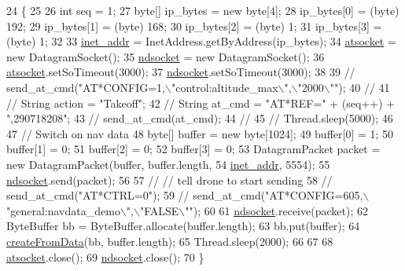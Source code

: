 \begin{DoxyCode}
24                                                             \{
25 
26         \textcolor{keywordtype}{int} seq = 1;
27         byte[] ip\_bytes = \textcolor{keyword}{new} byte[4];
28         ip\_bytes[0] = (byte) 192;
29         ip\_bytes[1] = (byte) 168;
30         ip\_bytes[2] = (byte) 1;
31         ip\_bytes[3] = (byte) 1;
32 
33         \hyperlink{classworkspace_1_1_a_r_drone_nav_data_1_1src_1_1_nav_data_a822661933201f8b0c1c6da6919b62b81}{inet\_addr} = InetAddress.getByAddress(ip\_bytes);
34         \hyperlink{classworkspace_1_1_a_r_drone_nav_data_1_1src_1_1_nav_data_a06573f3f3fcbeb54e9d5d087410117ac}{atsocket} = \textcolor{keyword}{new} DatagramSocket();
35         \hyperlink{classworkspace_1_1_a_r_drone_nav_data_1_1src_1_1_nav_data_acd9de63f69b79f1313078311d7725cda}{ndsocket} = \textcolor{keyword}{new} DatagramSocket();
36         \hyperlink{classworkspace_1_1_a_r_drone_nav_data_1_1src_1_1_nav_data_a06573f3f3fcbeb54e9d5d087410117ac}{atsocket}.setSoTimeout(3000);
37         \hyperlink{classworkspace_1_1_a_r_drone_nav_data_1_1src_1_1_nav_data_acd9de63f69b79f1313078311d7725cda}{ndsocket}.setSoTimeout(3000);
38 
39 \textcolor{comment}{//      send\_at\_cmd("AT*CONFIG=1,\(\backslash\)"control:altitude\_max\(\backslash\)",\(\backslash\)"2000\(\backslash\)"");}
40 \textcolor{comment}{//}
41 \textcolor{comment}{//      String action = "Takeoff";}
42 \textcolor{comment}{//      String at\_cmd = "AT*REF=" + (seq++) + ",290718208";}
43 \textcolor{comment}{//      send\_at\_cmd(at\_cmd);}
44 \textcolor{comment}{//}
45 \textcolor{comment}{//      Thread.sleep(5000);}
46 
47         \textcolor{comment}{// Switch on nav data}
48         byte[] buffer = \textcolor{keyword}{new} byte[1024];
49         buffer[0] = 1;
50         buffer[1] = 0;
51         buffer[2] = 0;
52         buffer[3] = 0;
53         DatagramPacket packet = \textcolor{keyword}{new} DatagramPacket(buffer, buffer.length,
54                 \hyperlink{classworkspace_1_1_a_r_drone_nav_data_1_1src_1_1_nav_data_a822661933201f8b0c1c6da6919b62b81}{inet\_addr}, 5554);
55         \hyperlink{classworkspace_1_1_a_r_drone_nav_data_1_1src_1_1_nav_data_acd9de63f69b79f1313078311d7725cda}{ndsocket}.send(packet);
56 
57 \textcolor{comment}{//      // tell drone to start sending}
58 \textcolor{comment}{//      send\_at\_cmd("AT*CTRL=0");}
59 \textcolor{comment}{//      send\_at\_cmd("AT*CONFIG=605,\(\backslash\)"general:navdata\_demo\(\backslash\)",\(\backslash\)"FALSE\(\backslash\)"");}
60 
61         \hyperlink{classworkspace_1_1_a_r_drone_nav_data_1_1src_1_1_nav_data_acd9de63f69b79f1313078311d7725cda}{ndsocket}.receive(packet);
62         ByteBuffer bb = ByteBuffer.allocate(buffer.length);
63         bb.put(buffer);
64         \hyperlink{classworkspace_1_1_a_r_drone_nav_data_1_1src_1_1_nav_data_a48f7de7994b48a30f09910e9971d300d}{createFromData}(bb, buffer.length);
65         Thread.sleep(2000);
66 
67 
68         \hyperlink{classworkspace_1_1_a_r_drone_nav_data_1_1src_1_1_nav_data_a06573f3f3fcbeb54e9d5d087410117ac}{atsocket}.close();
69         \hyperlink{classworkspace_1_1_a_r_drone_nav_data_1_1src_1_1_nav_data_acd9de63f69b79f1313078311d7725cda}{ndsocket}.close();
70     \}
\end{DoxyCode}


